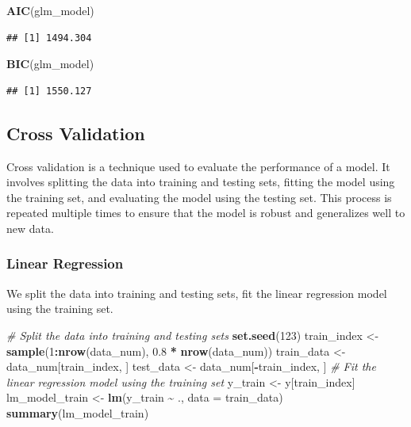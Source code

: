 \documentclass[
]{article}
\newenvironment{Shaded}{\begin{snugshade}}{\end{snugshade}}
\newcommand{\AttributeTok}[1]{\textcolor[rgb]{0.13,0.29,0.53}{#1}}
\newcommand{\CommentTok}[1]{\textcolor[rgb]{0.56,0.35,0.01}{\textit{#1}}}
\newcommand{\DecValTok}[1]{\textcolor[rgb]{0.00,0.00,0.81}{#1}}
\newcommand{\FloatTok}[1]{\textcolor[rgb]{0.00,0.00,0.81}{#1}}
\newcommand{\FunctionTok}[1]{\textcolor[rgb]{0.13,0.29,0.53}{\textbf{#1}}}
\newcommand{\NormalTok}[1]{#1}
\newcommand{\OtherTok}[1]{\textcolor[rgb]{0.56,0.35,0.01}{#1}}
\newcommand{\SpecialCharTok}[1]{\textcolor[rgb]{0.81,0.36,0.00}{\textbf{#1}}}
\begin{document}
\begin{Shaded}
\begin{Highlighting}[]
\FunctionTok{AIC}\NormalTok{(glm\_model)}
\end{Highlighting}
\end{Shaded}

\begin{verbatim}
## [1] 1494.304
\end{verbatim}

\begin{Shaded}
\begin{Highlighting}[]
\FunctionTok{BIC}\NormalTok{(glm\_model)}
\end{Highlighting}
\end{Shaded}

\begin{verbatim}
## [1] 1550.127
\end{verbatim}

\subsection{Cross Validation}\label{cross-validation}

Cross validation is a technique used to evaluate the performance of a
model. It involves splitting the data into training and testing sets,
fitting the model using the training set, and evaluating the model using
the testing set. This process is repeated multiple times to ensure that
the model is robust and generalizes well to new data.

\subsubsection{Linear Regression}\label{linear-regression-1}

We split the data into training and testing sets, fit the linear
regression model using the training set.

\begin{Shaded}
\begin{Highlighting}[]
\CommentTok{\# Split the data into training and testing sets}
\FunctionTok{set.seed}\NormalTok{(}\DecValTok{123}\NormalTok{)}
\NormalTok{train\_index }\OtherTok{\textless{}{-}} \FunctionTok{sample}\NormalTok{(}\DecValTok{1}\SpecialCharTok{:}\FunctionTok{nrow}\NormalTok{(data\_num), }\FloatTok{0.8} \SpecialCharTok{*} \FunctionTok{nrow}\NormalTok{(data\_num))}
\NormalTok{train\_data }\OtherTok{\textless{}{-}}\NormalTok{ data\_num[train\_index, ]}
\NormalTok{test\_data }\OtherTok{\textless{}{-}}\NormalTok{ data\_num[}\SpecialCharTok{{-}}\NormalTok{train\_index, ]}
\CommentTok{\# Fit the linear regression model using the training set}
\NormalTok{y\_train }\OtherTok{\textless{}{-}}\NormalTok{ y[train\_index]}
\NormalTok{lm\_model\_train }\OtherTok{\textless{}{-}} \FunctionTok{lm}\NormalTok{(y\_train }\SpecialCharTok{\textasciitilde{}}\NormalTok{ ., }\AttributeTok{data =}\NormalTok{ train\_data)}
\FunctionTok{summary}\NormalTok{(lm\_model\_train)}
\end{Highlighting}
\end{Shaded}
\end{document}
